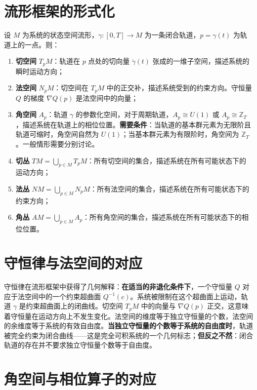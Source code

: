 \section*{流形框架的形式化}

设 $M$ 为系统的状态空间流形，$\gamma: [0,T] \to M$ 为一条闭合轨道，$p = \gamma(t)$ 为轨道上的一点。则：

\begin{enumerate}[leftmargin=4em, label={(\arabic*)}]
    \item \textbf{切空间} $T_p M$：轨道在 $p$ 点处的切向量 $\dot{\gamma}(t)$ 张成的一维子空间，描述系统的瞬时运动方向；
    \item \textbf{法空间} $N_p M$：切空间在 $T_p M$ 中的正交补，描述系统受到的约束方向。守恒量 $Q$ 的梯度 $\nabla Q(p)$ 是法空间中的向量；
    \item \textbf{角空间} $A_p$：轨道 $\gamma$ 的参数化空间，对于周期轨道，$A_p \cong U(1)$ 或 $A_p \cong \mathbb{Z}_T$，描述系统在轨道上的相位位置。\textbf{需要条件}：当轨道的基本群元素为无限阶且轨道可缩时，角空间自然为 $U(1)$；当基本群元素为有限阶时，角空间为 $\mathbb{Z}_T$。一般情形需要分别讨论。
    \item \textbf{切丛} $TM = \bigcup_{p \in M} T_p M$：所有切空间的集合，描述系统在所有可能状态下的运动方向；
    \item \textbf{法丛} $NM = \bigcup_{p \in M} N_p M$：所有法空间的集合，描述系统在所有可能状态下的约束方向；
    \item \textbf{角丛} $AM = \bigcup_{p \in M} A_p$：所有角空间的集合，描述系统在所有可能状态下的相位位置。
\end{enumerate}

\section*{守恒律与法空间的对应}

守恒律在流形框架中获得了几何解释：\textbf{在适当的非退化条件下}，一个守恒量 $Q$ 对应于法空间中的一个约束超曲面 $Q^{-1}(c)$。系统被限制在这个超曲面上运动，轨道 $\gamma$ 是约束超曲面上的闭曲线。切空间 $T_p M$ 中的向量与 $\nabla Q(p)$ 正交，这意味着守恒量在运动方向上不发生变化。法空间的维度等于独立守恒量的个数，法空间的余维度等于系统的有效自由度。\textbf{当独立守恒量的个数等于系统的自由度时}，轨道被完全约束为闭合曲线——这是完全可积系统的一个几何标志；\textbf{但反之不然}：闭合轨道的存在并不要求独立守恒量个数等于自由度。

\section*{角空间与相位算子的对应}

